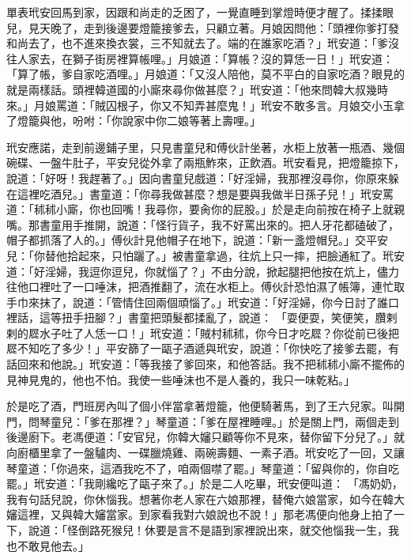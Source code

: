 單表玳安回馬到家，因跟和尚走的乏困了，一覺直睡到掌燈時便才醒了。揉揉眼兒，見天晚了，走到後邊要燈籠接爹去，只顧立著。月娘因問他：「頭裡你爹打發和尚去了，也不進來換衣裳，三不知就去了。端的在誰家吃酒？」玳安道：「爹沒往人家去，在獅子街房裡算帳哩。」月娘道：「算帳？沒的算恁一日！」玳安道： 「算了帳，爹自家吃酒哩。」月娘道：「又沒人陪他，莫不平白的自家吃酒？眼見的就是兩樣話。頭裡韓道國的小廝來尋你做甚麼？」玳安道：「他來問韓大叔幾時來。」月娘罵道：「賊囚根子，你又不知弄甚麼鬼！」玳安不敢多言。月娘交小玉拿了燈籠與他，吩咐：「你說家中你二娘等著上壽哩。」

玳安應諾，走到前邊鋪子里，只見書童兒和傅伙計坐著，水柜上放著一瓶酒、幾個碗碟、一盤牛肚子，平安兒從外拿了兩瓶鮓來，正飲酒。玳安看見，把燈籠掠下，說道：「好呀！我趕著了。」因向書童兒戲道：「好淫婦，我那裡沒尋你，你原來躲在這裡吃酒兒。」書童道：「你尋我做甚麼？想是要與我做半日孫子兒！」玳安罵道：「秫秫小廝，你也回嘴！我尋你，要肏你的屁股。」於是走向前按在椅子上就親嘴。那書童用手推開，說道：「怪行貨子，我不好罵出來的。把人牙花都磕破了，帽子都抓落了人的。」傅伙計見他帽子在地下，說道：「新一盞燈帽兒。」交平安兒：「你替他拾起來，只怕躧了。」被書童拿過，往炕上只一摔，把臉通紅了。玳安道：「好淫婦，我逗你逗兒，你就惱了？」不由分說，掀起腿把他按在炕上，儘力往他口裡吐了一口唾沫，把酒推翻了，流在水柜上。傅伙計恐怕濕了帳簿，連忙取手巾來抹了，說道：「管情住回兩個頑惱了。」玳安道：「好淫婦，你今日討了誰口裡話，這等扭手扭腳？」書童把頭髮都揉亂了，說道： 「耍便耍，笑便笑，臢剌剌的㞞水子吐了人恁一口！」玳安道：「賊村秫秫，你今日才吃㞞？你從前已後把㞞不知吃了多少！」平安篩了一甌子酒遞與玳安，說道：「你快吃了接爹去罷，有話回來和他說。」玳安道：「等我接了爹回來，和他答話。我不把秫秫小廝不擺佈的見神見鬼的，他也不怕。我使一些唾沫也不是人養的，我只一味乾粘。」

於是吃了酒，門班房內叫了個小伴當拿著燈籠，他便騎著馬，到了王六兒家。叫開門，問琴童兒：「爹在那裡？」琴童道：「爹在屋裡睡哩。」於是關上門，兩個走到後邊廚下。老馮便道：「安官兒，你韓大嬸只顧等你不見來，替你留下分兒了。」就向廚櫃里拿了一盤驢肉、一碟臘燒雞、兩碗壽麵、一素子酒。玳安吃了一回，又讓琴童道：「你過來，這酒我吃不了，咱兩個噤了罷。」琴童道：「留與你的，你自吃罷。」玳安道：「我剛纔吃了甌子來了。」於是二人吃畢，玳安便叫道： 「馮奶奶，我有句話兒說，你休惱我。想著你老人家在六娘那裡，替俺六娘當家，如今在韓大嬸這裡，又與韓大嬸當家。到家看我對六娘說也不說！」那老馮便向他身上拍了一下，說道：「怪倒路死猴兒！休要是言不是語到家裡說出來，就交他惱我一生，我也不敢見他去。」

